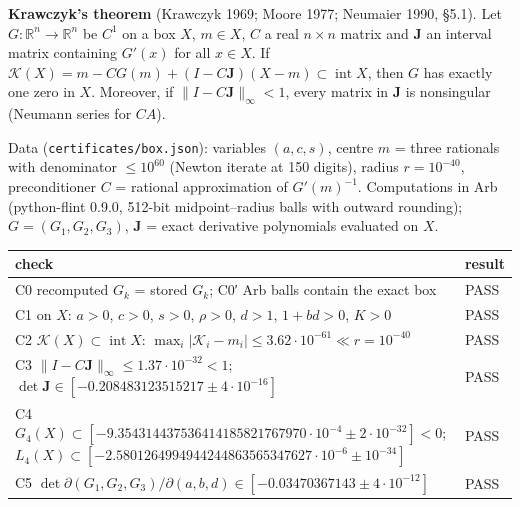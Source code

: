 \documentclass[11pt,a4paper]{report}
\begin{document}
\textbf{Krawczyk's theorem} (Krawczyk 1969; Moore 1977; Neumaier 1990, §5.1). Let \(G:\mathbb R^n\to\mathbb R^n\) be
\(C^1\) on a box \(X\), \(m\in X\), \(C\) a real \(n\times n\) matrix and \(\mathbf J\) an interval matrix
containing \(G'(x)\) for all \(x\in X\). If
\(\mathcal K(X)=m-CG(m)+(I-C\mathbf J)(X-m)\subset\operatorname{int}X\), then \(G\) has exactly one zero in
\(X\). Moreover, if \(\|I-C\mathbf J\|_\infty<1\), every matrix in \(\mathbf J\) is nonsingular (Neumann series
for \(CA\)).

Data (\texttt{certificates/box.json}): variables \((a,c,s)\), centre \(m\) = three rationals with denominator
\(\le 10^{60}\) (Newton iterate at 150 digits), radius \(r=10^{-40}\), preconditioner \(C\) = rational
approximation of \(G'(m)^{-1}\). Computations in Arb (python-flint 0.9.0, 512-bit midpoint--radius balls with
outward rounding); \(G=(G_1,G_2,G_3)\), \(\mathbf J\) = exact derivative polynomials evaluated on \(X\).

{\def\LTcaptype{none} %
\begin{longtable}[]{@{}
  >{\raggedright\arraybackslash}p{}
  >{\raggedright\arraybackslash}p{}@{}}
\toprule\noalign{}
\begin{minipage}[b]{\linewidth}\raggedright
check
\end{minipage} & \begin{minipage}[b]{\linewidth}\raggedright
result
\end{minipage} \\
\midrule\noalign{}
\endhead
\bottomrule\noalign{}
\endlastfoot
C0 recomputed \(G_k\) = stored \(G_k\); C0′ Arb balls contain the exact box & PASS \\
C1 on \(X\): \(a>0\), \(c>0\), \(s>0\), \(\rho>0\), \(d>1\), \(1+bd>0\), \(K>0\) & PASS \\
C2 \(\mathcal K(X)\subset\operatorname{int}X\): \(\max_i|\mathcal K_i-m_i|\le3.62\cdot10^{-61}\ll r=10^{-40}\) & PASS \\
C3 \(\|I-C\mathbf J\|_\infty\le1.37\cdot10^{-32}<1\); \(\det\mathbf J\in[-0.208483123515217\pm4\cdot10^{-16}]\) & PASS \\
C4 \(G_4(X)\subset[-9.354314437536414185821767970\cdot10^{-4}\pm2\cdot10^{-32}]<0\); \(L_4(X)\subset[-2.5801264994944244863565347627\cdot10^{-6}\pm10^{-34}]\) & PASS \\
C5 \(\det\partial(G_1,G_2,G_3)/\partial(a,b,d)\in[-0.03470367143\pm4\cdot10^{-12}]\) & PASS \\
\end{longtable}
}
\end{document}
